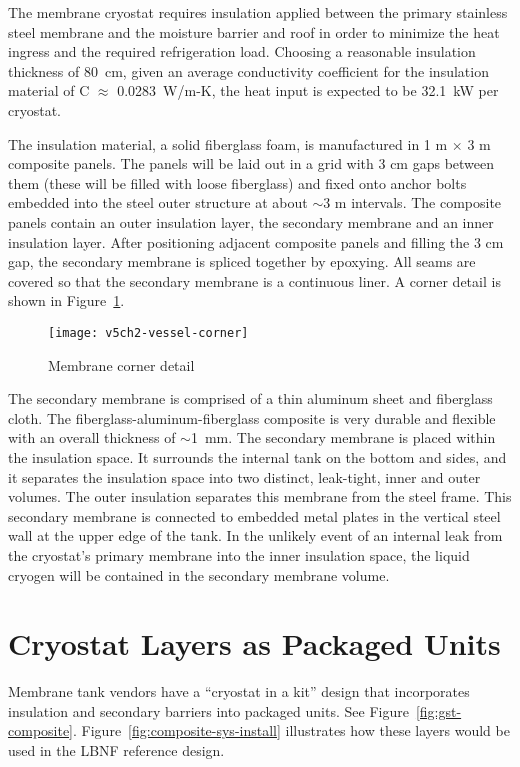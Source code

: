 The membrane cryostat requires insulation applied between the 
primary stainless steel membrane and the moisture barrier and 
roof in order to minimize the heat ingress and the required 
refrigeration load. Choosing a reasonable insulation 
thickness of 80~cm, given an average conductivity coefficient 
for the insulation material of C $\approx$ 0.0283~W/m-K, the 
heat input is expected to be 32.1~kW 
per cryostat. %



The insulation material, a solid fiberglass foam, is manufactured in 1 m 
$\times$ 3 m composite panels. The panels will be laid out in a grid with 
3 cm gaps between them (these will be filled with loose fiberglass) and 
fixed onto anchor bolts embedded into the steel outer structure
at about $\sim$3 m intervals. 
The composite panels contain an outer insulation layer, the secondary 
membrane and an inner insulation layer. After positioning adjacent 
composite panels and filling the 3 cm gap, the secondary membrane 
is spliced together by epoxying. All seams are covered so that the secondary
membrane is a continuous liner. A corner detail is shown 
in Figure~\ref{fig:vessel-corner}.


\begin{figure}[htbp]
\centering
\texttt{[image: v5ch2-vessel-corner]}
\caption{Membrane corner detail}
\label{fig:vessel-corner} %
\end{figure}

The secondary membrane is comprised of a thin aluminum sheet and 
fiberglass cloth. The fiberglass-aluminum-fiberglass composite is 
very durable and flexible with an overall thickness of $\sim$1~mm.  
The secondary membrane is placed within the insulation space. It 
surrounds the internal tank on the bottom and sides, and it 
separates the insulation space into two distinct, leak-tight, 
inner and outer volumes. The outer insulation separates this 
membrane from the steel frame. This secondary membrane is connected 
to embedded metal plates in the vertical steel wall at the upper 
edge of the tank. In the unlikely event of an internal leak from 
the cryostat's primary membrane into the inner insulation space, 
the liquid cryogen will be contained in the 
secondary membrane volume.  

\section{Cryostat Layers as Packaged Units}
Membrane tank vendors have a ``cryostat in a kit'' design that 
incorporates insulation and secondary barriers into packaged 
units. See Figure~\ref{fig:gst-composite}.  
Figure~\ref{fig:composite-sys-install} illustrates how these 
layers would be used in the LBNF reference design.

